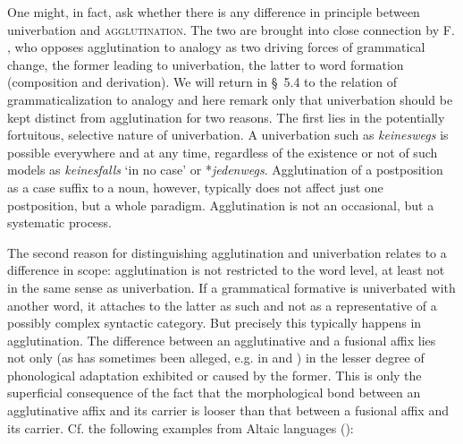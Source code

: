 One might, in fact, ask whether there is any difference in principle between univerbation and \textsc{agglutination}. The two are brought into close connection by F. \citet[Part 3, Ch. \textsc{vii}, §§~1f]{Saussure1916}, who opposes agglutination to analogy as two driving forces of grammatical change, the former leading to univerbation, the latter to word formation (composition and derivation). We will return in §~5.4 to the relation of grammaticalization to analogy and here remark only that univerbation should be kept distinct from agglutination for two reasons. The first lies in the potentially fortuitous, selective nature of univerbation. A univerbation such as \textit{keineswegs} is possible everywhere and at any time, regardless of the existence or not of such models as \textit{keinesfalls} ‘in no case’ or *\textit{jedenwegs}. Agglutination of a postposition as a case suffix to a noun, however, typically does not affect just one postposition, but a whole paradigm. Agglutination is not an occasional, but a systematic process.

The second reason for distinguishing agglutination and univerbation relates to a difference in scope: agglutination is not restricted to the word level, at least not in the same sense as univerbation. If a grammatical formative is univerbated with another word, it attaches to the latter as such and not as a representative of a possibly complex syntactic category. But precisely this typically happens in agglutination. The difference between an agglutinative and a fusional affix lies not only (as has sometimes been alleged, e.g. in \citet[Ch.~V]{Sapir1921} and \citet{Greenberg1954}) in the lesser degree of phonological adaptation exhibited or caused by the former. This is only the superficial consequence of the fact that the morphological bond between an agglutinative affix and its carrier is looser than that between a fusional affix and its carrier. Cf. the following examples from Altaic languages (\citealt[71]{Žirmunskij1966}):

